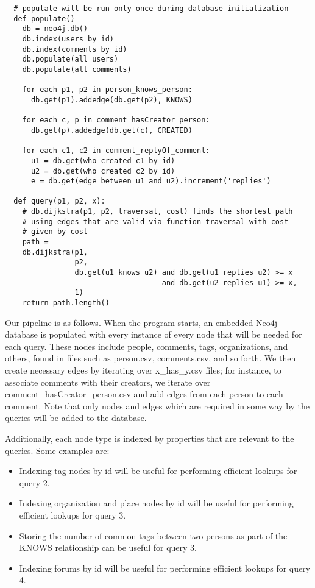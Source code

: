 \documentclass{article}
\begin{document}
\begin{verbatim}
  # populate will be run only once during database initialization
  def populate()
    db = neo4j.db()
    db.index(users by id)
    db.index(comments by id)
    db.populate(all users)
    db.populate(all comments)
    
    for each p1, p2 in person_knows_person:
      db.get(p1).addedge(db.get(p2), KNOWS)
    
    for each c, p in comment_hasCreator_person:
      db.get(p).addedge(db.get(c), CREATED)
    
    for each c1, c2 in comment_replyOf_comment:
      u1 = db.get(who created c1 by id)
      u2 = db.get(who created c2 by id)
      e = db.get(edge between u1 and u2).increment('replies')

  def query(p1, p2, x):
    # db.dijkstra(p1, p2, traversal, cost) finds the shortest path
    # using edges that are valid via function traversal with cost
    # given by cost
    path = 
    db.dijkstra(p1,
                p2,
                db.get(u1 knows u2) and db.get(u1 replies u2) >= x
                                    and db.get(u2 replies u1) >= x,
                1)
    return path.length()
\end{verbatim}


Our pipeline is as follows.  When the program starts, an embedded
Neo4j database is populated with every instance of every node that
will be needed for each query.  These nodes include people, comments,
tags, organizations, and others, found in files such as person.csv,
comments.csv, and so forth. We then create necessary edges by iterating over
x\_has\_y.csv files; for instance, to associate comments with their
creators, we iterate over comment\_hasCreator\_person.csv and add
edges from each person to each comment.  Note that only nodes and
edges which are required in some way by the queries will be added to
the database.

Additionally, each node type is indexed by properties that are 
relevant to the queries. Some examples are:

\begin{itemize}
\item Indexing tag nodes by id will be useful for performing efficient 
lookups for query 2.
\item Indexing organization and place nodes by id will be useful for 
performing efficient lookups for query 3.
\item Storing the number of common tags between two persons as part of 
the KNOWS relationship can be useful for query 3.
\item Indexing forums by id will be useful for performing efficient lookups 
for query 4.
\end{itemize}
\end{document}
